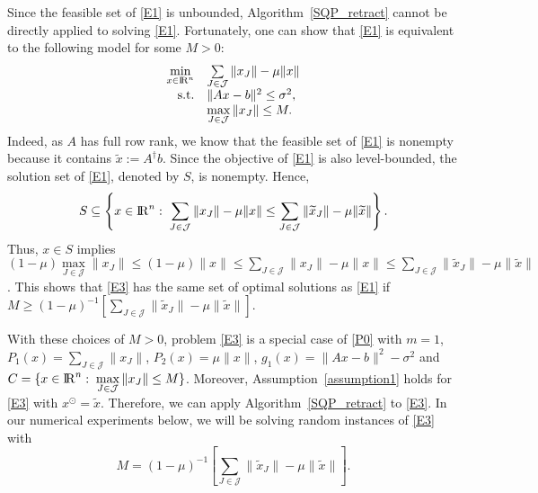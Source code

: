 \documentclass[10pt]{article}
\numberwithin{equation}{section}
\def\R{{\rm I\!R}}
\def\tx{{\widetilde x}}
\def\xfeas{x^\odot}
\begin{document}
Since the feasible set of \eqref{E1} is unbounded, Algorithm~\ref{SQP_retract} cannot be directly applied to solving \eqref{E1}. Fortunately, one can show that \eqref{E1} is equivalent to the following model for some $M > 0$:
\begin{equation}\label{E3}
  \begin{array}{rl}
\min\limits_{x\in\R^n} & \sum\limits_{J\in\mathcal{J}}\|x_J\| - \mu\|x\| \\
{\rm s.t.} & \|Ax - b\|^2\leq \sigma^2,\\
           & \max\limits_{J\in \mathcal{J}}\|x_J\| \leq M.
  \end{array}
\end{equation}
Indeed, as $A$ has full row rank, we know that the feasible set of \eqref{E1} is nonempty because it contains $\tx := A^\dagger b$. Since the objective of \eqref{E1} is also level-bounded, the solution set of \eqref{E1}, denoted by $S$, is nonempty. Hence,
\[
S\subseteq \left\{x\in\R^n:\; \sum\limits_{J\in\mathcal{J}}\|x_J\| - \mu\|x\| \le \sum\limits_{J\in\mathcal{J}}\|\tx_J\| - \mu\|\tx\|\right\}.
\]
Thus, $x\in S$ implies $(1 - \mu)\max\limits_{J\in \mathcal{J}}\|x_J\| \le (1 - \mu)\|x\|\le \sum\limits_{J\in\mathcal{J}}\|x_J\| - \mu\|x\| \le \sum\limits_{J\in\mathcal{J}}\|\tx_J\| - \mu\|\tx\|$. This shows that \eqref{E3} has the same set of optimal solutions as \eqref{E1} if $M \ge (1 - \mu)^{-1}[\sum\limits_{J\in\mathcal{J}}\|\tx_J\| - \mu\|\tx\|]$.

With these choices of $M > 0$, problem \eqref{E3} is a special case of \eqref{P0} with $m = 1$, $P_1(x)= \sum\limits_{J\in\mathcal{J}}\|x_J\|$, $P_2(x) = \mu\|x\|$, $g_1(x) = \|Ax - b\|^2 - \sigma^2$ and $C = \{x\in\R^n:\; \max\limits_{J\in \mathcal{J}}\|x_J\| \leq M\}$. Moreover, Assumption~\ref{assumption1} holds for \eqref{E3} with $\xfeas = \tx$. Therefore, we can apply Algorithm~\ref{SQP_retract} to \eqref{E3}. In our numerical experiments below, we will be solving random instances of \eqref{E3} with $$M = (1 - \mu)^{-1}[\sum\limits_{J\in\mathcal{J}}\|\tx_J\| - \mu\|\tx\|].$$
\end{document}
